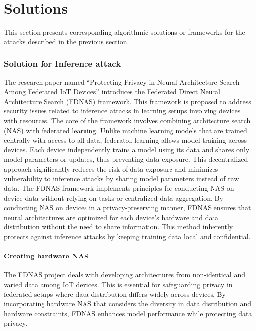 \documentclass[conference]{IEEEtran}
\begin{document}
\section{Solutions}
This section presents corresponding algorithmic solutions or frameworks for the attacks described in the previous section. 
\subsubsection{\textbf{Solution for Inference attack}}
The research paper named \enquote{Protecting Privacy in Neural Architecture Search Among Federated IoT Devices} introduces the Federated Direct Neural Architecture Search (FDNAS) framework. This framework is proposed to address security issues related to inference attacks in learning setups involving devices with resources.
The core of the framework involves combining architecture search (NAS) with federated learning. Unlike machine learning models that are trained centrally with access to all data, federated learning allows model training across devices. Each device independently trains a model using its data and shares only model parameters or updates, thus preventing data exposure. This decentralized approach significantly reduces the risk of data exposure and minimizes vulnerability to inference attacks by sharing model parameters instead of raw data.
The FDNAS framework implements principles for conducting NAS on device data without relying on tasks or centralized data aggregation. By conducting NAS on devices in a privacy-preserving manner, FDNAS ensures that neural architectures are optimized for each device's hardware and data distribution without the need to share information. This method inherently protects against inference attacks by keeping training data local and confidential.
\paragraph{Creating hardware NAS} The FDNAS project deals with developing architectures from non-identical and varied data among IoT devices. This is essential for safeguarding privacy in federated setups where data distribution differs widely across devices. By incorporating hardware NAS that considers the diversity in data distribution and hardware constraints, FDNAS enhances model performance while protecting data privacy.
\end{document}
